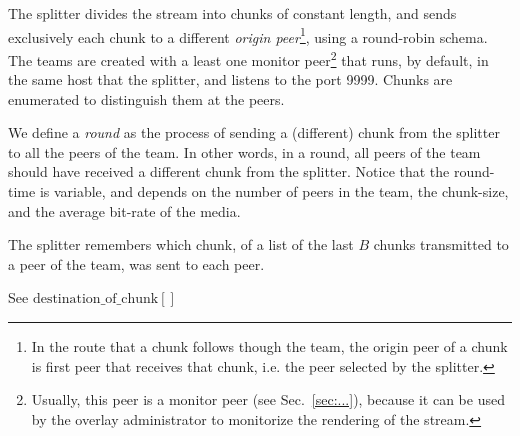 
\label{sec:feeding_the_team}

The splitter divides the stream into chunks of constant length, and
sends exclusively each chunk to a different \emph{origin
  peer}\footnote{In the route that a chunk follows though the team,
  the origin peer of a chunk is first peer that receives that chunk,
  i.e. the peer selected by the splitter.}, using a round-robin
schema. The teams are created with a least one monitor
peer\footnote{Usually, this peer is a monitor peer (see
  Sec.~\ref{sec:...}), because it can be used by the overlay
  administrator to monitorize the rendering of the stream.} that runs,
by default, in the same host that the splitter, and listens to the
port 9999. Chunks are enumerated to distinguish them at the peers.

\begin{comment}
More details about the implementation
are available in Fig.~\ref{fig:chunk_generation}.


\begin{figure*}
  \fig{500}{5cm}{DBS_splitter_feed} \caption{Chunk
    generation at the splitter and their transmission to the
    team.\label{fig:chunk_generation}}
\end{figure*}
\end{comment}

We define a \emph{round} as the process of sending a (different) chunk
from the splitter to all the peers of the team. In other words, in a
round, all peers of the team should have received a different chunk
from the splitter. Notice that the round-time is variable, and depends
on the number of peers in the team, the chunk-size, and the average
bit-rate of the media.

The splitter remembers which chunk, of a list of the last $B$ chunks
transmitted to a peer of the team, was sent to each peer.

\begin{notex}
  See \href{https://github.com/P2PSP/simulator/blob/f0c73be1817e7d3b816cc61cd2c8e59b17f9a0e6/src/core/splitter_dbs.py#L296}{$\text{destination\_of\_chunk}[]$}
\end{notex}

